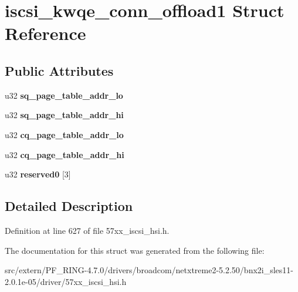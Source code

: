 \hypertarget{structiscsi__kwqe__conn__offload1}{
\section{iscsi\_\-kwqe\_\-conn\_\-offload1 Struct Reference}
\label{structiscsi__kwqe__conn__offload1}
}
\subsection*{Public Attributes}
\begin{DoxyCompactItemize}
\item 
\hypertarget{structiscsi__kwqe__conn__offload1_ab3c61a53d382ba19321897be6452bff8}{
u32 {\bfseries sq\_\-page\_\-table\_\-addr\_\-lo}}
\label{structiscsi__kwqe__conn__offload1_ab3c61a53d382ba19321897be6452bff8}

\item 
\hypertarget{structiscsi__kwqe__conn__offload1_a03bd26c037b5124c8308ebbe870c9349}{
u32 {\bfseries sq\_\-page\_\-table\_\-addr\_\-hi}}
\label{structiscsi__kwqe__conn__offload1_a03bd26c037b5124c8308ebbe870c9349}

\item 
\hypertarget{structiscsi__kwqe__conn__offload1_aaa8e13d7b075c4148356058d968dc6d0}{
u32 {\bfseries cq\_\-page\_\-table\_\-addr\_\-lo}}
\label{structiscsi__kwqe__conn__offload1_aaa8e13d7b075c4148356058d968dc6d0}

\item 
\hypertarget{structiscsi__kwqe__conn__offload1_a7f2be9fe90bf88c4dc5976c576fa9d42}{
u32 {\bfseries cq\_\-page\_\-table\_\-addr\_\-hi}}
\label{structiscsi__kwqe__conn__offload1_a7f2be9fe90bf88c4dc5976c576fa9d42}

\item 
\hypertarget{structiscsi__kwqe__conn__offload1_a97c37303e58d901894e1fd93aceac542}{
u32 {\bfseries reserved0} \mbox{[}3\mbox{]}}
\label{structiscsi__kwqe__conn__offload1_a97c37303e58d901894e1fd93aceac542}

\end{DoxyCompactItemize}


\subsection{Detailed Description}


Definition at line 627 of file 57xx\_\-iscsi\_\-hsi.h.



The documentation for this struct was generated from the following file:\begin{DoxyCompactItemize}
\item 
src/extern/PF\_\-RING-\/4.7.0/drivers/broadcom/netxtreme2-\/5.2.50/bnx2i\_\-sles11-\/2.0.1e-\/05/driver/57xx\_\-iscsi\_\-hsi.h\end{DoxyCompactItemize}
